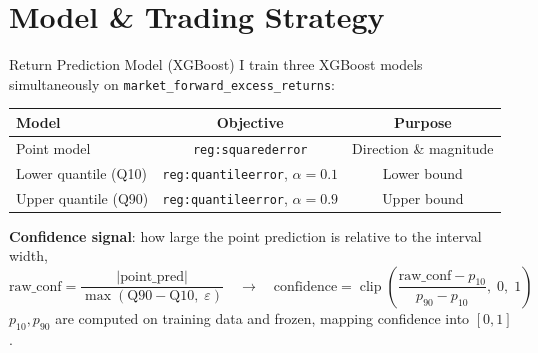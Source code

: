 \documentclass[aspectratio=169]{beamer}
\begin{document}
\section{Model \& Trading Strategy}

\begin{frame}{Return Prediction Model (XGBoost)}
I train three XGBoost models simultaneously on \texttt{market\_forward\_excess\_returns}:
\vspace{0.15cm}
\begin{center}
\small
\begin{tabular}{lcc}
\toprule
\textbf{Model} & \textbf{Objective} & \textbf{Purpose} \\
\midrule
Point model   & \texttt{reg:squarederror}  & Direction \& magnitude \\
Lower quantile (Q10) & \texttt{reg:quantileerror}, $\alpha=0.1$ & Lower bound \\
Upper quantile (Q90) & \texttt{reg:quantileerror}, $\alpha=0.9$ & Upper bound \\
\bottomrule
\end{tabular}
\end{center}
\vspace{0.2cm}
\textbf{Confidence signal}: how large the point prediction is relative to the interval width,
\[
\text{raw\_conf} = \frac{|\text{point\_pred}|}{\max(\text{Q90} - \text{Q10},\; \varepsilon)} \quad \longrightarrow \quad
\text{confidence} = \operatorname{clip}\!\left(\frac{\text{raw\_conf} - p_{10}}{p_{90} - p_{10}},\; 0,\; 1\right)
\]
$p_{10}, p_{90}$ are computed on training data and frozen, mapping confidence into $[0,1]$.
\end{frame}
\end{document}
